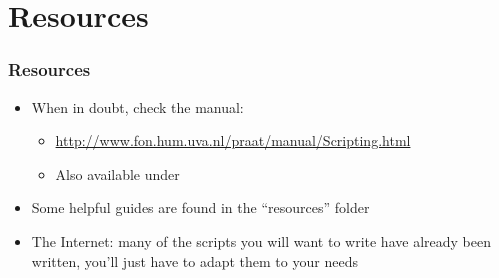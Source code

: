 \documentclass[handout]{beamer}
\begin{document}
\section{Resources}
\begin{frame}[fragile]
\frametitle{Resources}

\begin{itemize}
    \item When in doubt, check the manual:
    \begin{itemize}
        \item \url{http://www.fon.hum.uva.nl/praat/manual/Scripting.html}
        \item Also available under 
    \end{itemize}    

    \item Some helpful guides are found in the ``resources'' folder

    \item The Internet: many of the scripts you will want to write have already been written, you'll just have to adapt them to your needs

\end{itemize}
\end{frame}
\end{document}
